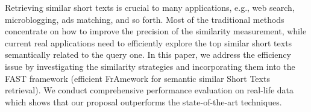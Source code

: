 Retrieving similar short texts is crucial to many applications, e.g., web search, microblogging, ads matching, and so forth. Most of the traditional methods concentrate on how to improve the precision of the similarity measurement, while current real applications need to efficiently explore the top similar short texts semantically related to the query one. In this paper, we address the efficiency issue by investigating the similarity strategies and incorporating them into the FAST framework (efficient FrAmework for semantic similar Short Texts retrieval). We conduct comprehensive performance evaluation on real-life data which shows that our proposal outperforms the state-of-the-art techniques.
